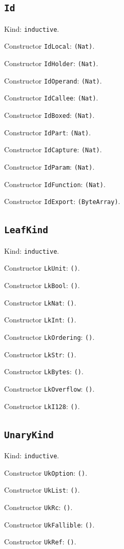 \documentclass[11pt]{article}
\begin{document}
\subsection*{\texttt{Id}}
\noindent Kind: \texttt{inductive}.\par
\noindent Constructor \texttt{IdLocal}: \texttt{(Nat)}.\par
\noindent Constructor \texttt{IdHolder}: \texttt{(Nat)}.\par
\noindent Constructor \texttt{IdOperand}: \texttt{(Nat)}.\par
\noindent Constructor \texttt{IdCallee}: \texttt{(Nat)}.\par
\noindent Constructor \texttt{IdBoxed}: \texttt{(Nat)}.\par
\noindent Constructor \texttt{IdPart}: \texttt{(Nat)}.\par
\noindent Constructor \texttt{IdCapture}: \texttt{(Nat)}.\par
\noindent Constructor \texttt{IdParam}: \texttt{(Nat)}.\par
\noindent Constructor \texttt{IdFunction}: \texttt{(Nat)}.\par
\noindent Constructor \texttt{IdExport}: \texttt{(ByteArray)}.\par
\subsection*{\texttt{LeafKind}}
\noindent Kind: \texttt{inductive}.\par
\noindent Constructor \texttt{LkUnit}: \texttt{()}.\par
\noindent Constructor \texttt{LkBool}: \texttt{()}.\par
\noindent Constructor \texttt{LkNat}: \texttt{()}.\par
\noindent Constructor \texttt{LkInt}: \texttt{()}.\par
\noindent Constructor \texttt{LkOrdering}: \texttt{()}.\par
\noindent Constructor \texttt{LkStr}: \texttt{()}.\par
\noindent Constructor \texttt{LkBytes}: \texttt{()}.\par
\noindent Constructor \texttt{LkOverflow}: \texttt{()}.\par
\noindent Constructor \texttt{LkI128}: \texttt{()}.\par
\subsection*{\texttt{UnaryKind}}
\noindent Kind: \texttt{inductive}.\par
\noindent Constructor \texttt{UkOption}: \texttt{()}.\par
\noindent Constructor \texttt{UkList}: \texttt{()}.\par
\noindent Constructor \texttt{UkRc}: \texttt{()}.\par
\noindent Constructor \texttt{UkFallible}: \texttt{()}.\par
\noindent Constructor \texttt{UkRef}: \texttt{()}.\par
\end{document}
